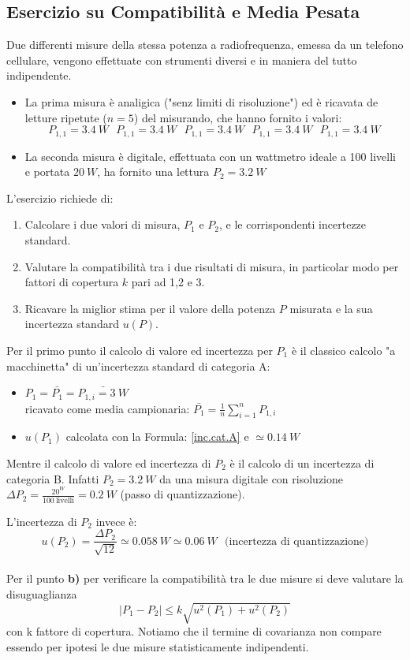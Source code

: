 \documentclass[a4paper,11pt]{report}
\begin{document}
\subsection{Esercizio su Compatibilità e Media Pesata}
Due differenti misure della stessa potenza a radiofrequenza, emessa da un telefono cellulare, vengono effettuate con strumenti diversi e in maniera del tutto indipendente.
\begin{itemize}
  \item La prima misura è analigica ("senz limiti di risoluzione") ed è ricavata de letture ripetute ($n=5$) del misurando, che hanno fornito i valori:
  $$
    P_{1,1} = 3.4~W~~~P_{1,1} = 3.4~W~~~P_{1,1} = 3.4~W~~~P_{1,1} = 3.4~W~~~P_{1,1} = 3.4~W 
  $$
  \item La seconda misura è digitale, effettuata con un wattmetro ideale a 100 livelli e portata $20~W$, ha fornito una lettura $P_2 = 3.2~W$
\end{itemize}
L'esercizio richiede di:
\begin{enumerate}
  \item Calcolare i due valori di misura, $P_1$ e $P_2$, e le corrispondenti incertezze standard.
  \item Valutare la compatibilità tra i due risultati di misura, in particolar modo per fattori di copertura $k$ pari ad 1,2 e 3.
  \item Ricavare la miglior stima per il valore della potenza $P$ misurata e la sua incertezza standard $u(P)$.
\end{enumerate}
Per il primo punto il calcolo di valore ed incertezza per $P_1$ è il classico calcolo "a macchinetta" di un'incertezza standard di categoria A: 
\begin{itemize}
  \item $P_1 = \bar{P_1} = \bar{P_{1,i} = 3~W}$\\ricavato come media campionaria: $\bar{P_1} = \frac{1}{n}\sum^n_{i=1}P_{1,i}$
  \item $u(P_1)$ calcolata con la Formula: \ref{inc.cat.A} e $\simeq0.14~W$
\end{itemize}
Mentre il calcolo di valore ed incertezza di $P_2$ è il calcolo di un incertezza di categoria B. Infatti $P_2 = 3.2~W$ da una misura digitale con risoluzione $\Delta P_2 = \frac{20^W}{100~\text{livelli}} = 0.2~W$ (passo di quantizzazione).

L'incertezza di $P_2$ invece è:
$$
  u(P_2) = \frac{\Delta P_2}{\sqrt{12}} \simeq 0.058~W \simeq 0.06~W\text{~~(incertezza di quantizzazione)}
$$
\\
Per il punto \textbf{b)} per verificare la compatibilità tra le due misure si deve valutare la disuguaglianza
$$
  |P_1 - P_2| \le k \sqrt{u^2(P_1)+u^2(P_2)}
$$
con k fattore di copertura. Notiamo che il termine di covarianza non compare essendo per ipotesi le due misure statisticamente indipendenti.
\end{document}

